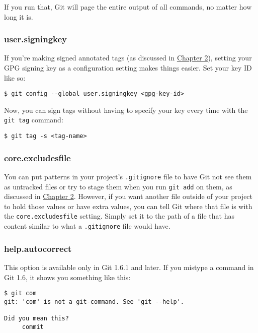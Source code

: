 \documentclass[a4paper]{book}
\newcommand{\prechap}{Chapter }
\newcommand{\postchap}{}
\newcommand{\chapref}[1]{\hyperref[chap:#1]{\prechap #1\postchap}}
\begin{document}
If you run that, Git will page the entire output of all commands, no matter how long it is.

\subsubsection{user.signingkey}

If you're making signed annotated tags (as discussed in \chapref{2}), setting your GPG signing key as a configuration setting makes things easier. Set your key ID like so:

\begin{shaded}\begin{verbatim}
$ git config --global user.signingkey <gpg-key-id>
\end{verbatim}\end{shaded}

Now, you can sign tags without having to specify your key every time with the \texttt{git tag} command:

\begin{shaded}\begin{verbatim}
$ git tag -s <tag-name>
\end{verbatim}\end{shaded}

\subsubsection{core.excludesfile}

You can put patterns in your project's \texttt{.gitignore} file to have Git not see them as untracked files or try to stage them when you run \texttt{git add} on them, as discussed in \chapref{2}. However, if you want another file outside of your project to hold those values or have extra values, you can tell Git where that file is with the \texttt{core.excludesfile} setting. Simply set it to the path of a file that has content similar to what a \texttt{.gitignore} file would have.

\subsubsection{help.autocorrect}

This option is available only in Git 1.6.1 and later. If you mistype a command in Git 1.6, it shows you something like this:

\begin{shaded}\begin{verbatim}
$ git com
git: 'com' is not a git-command. See 'git --help'.

Did you mean this?
     commit
\end{verbatim}\end{shaded}
\end{document}

